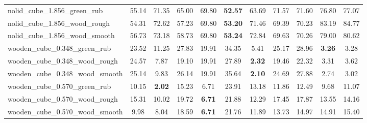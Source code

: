 \begin{table}[H]
{\begin{tabular}{l cccccccccc}
        nolid\_cube\_1.856\_green\_rub & 55.14 & 71.35 & 65.00 & 69.80 & \textbf{52.57} & 63.69 & 71.57 & 71.60 & 76.80 & 77.07 \\
        nolid\_cube\_1.856\_wood\_rough & 54.31 & 72.62 & 57.23 & 69.80 & \textbf{53.20} & 71.46 & 69.39 & 70.23 & 83.19 & 84.77 \\
        nolid\_cube\_1.856\_wood\_smooth & 56.73 & 73.18 & 58.73 & 69.80 & \textbf{53.24} & 72.84 & 69.63 & 70.26 & 79.00 & 80.62 \\
        wooden\_cube\_0.348\_green\_rub & 23.52 & 11.25 & 27.83 & 19.91 & 34.35 & 5.41 & 25.17 & 28.96 & \textbf{3.26} & 3.28 \\
        wooden\_cube\_0.348\_wood\_rough & 24.57 & 7.87 & 19.10 & 19.91 & 27.89 & \textbf{2.32} & 19.46 & 22.32 & 3.31 & 3.62 \\
        wooden\_cube\_0.348\_wood\_smooth & 25.14 & 9.83 & 26.14 & 19.91 & 35.64 & \textbf{2.10} & 24.69 & 27.88 & 2.74 & 3.02 \\
        wooden\_cube\_0.570\_green\_rub & 10.15 & \textbf{2.02} & 15.23 & 6.71 & 23.91 & 13.18 & 11.86 & 12.49 & 9.68 & 11.07 \\
        wooden\_cube\_0.570\_wood\_rough & 15.31 & 10.02 & 19.72 & \textbf{6.71} & 21.88 & 12.29 & 17.45 & 17.87 & 13.55 & 14.16 \\
        wooden\_cube\_0.570\_wood\_smooth & 9.98 & 8.04 & 18.59 & \textbf{6.71} & 21.76 & 11.89 & 13.73 & 14.97 & 14.91 & 15.40 \\
        \bottomrule
    \end{tabular}
    }
\end{table}



\vspace{1cm}

\clearpage

